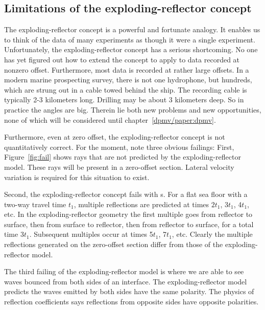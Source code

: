 \subsection{Limitations of the exploding-reflector concept}
\par
The exploding-reflector concept is a powerful and fortunate analogy.
It enables us to think of the data of many experiments
as though it were a single experiment.
Unfortunately,
the exploding-reflector concept has a serious shortcoming.
No one has yet figured out how to extend the concept
to apply to data recorded at nonzero offset.
Furthermore, most data is recorded at rather large offsets.
In a modern marine prospecting survey,
there is not one hydrophone,
but hundreds, which are strung out in a cable towed behind the ship.
The recording cable
is typically 2-3 kilometers long.
Drilling may be about 3 kilometers deep.
So in practice the angles are big.
Therein lie both new problems and new opportunities,
none of which will be considered until 
chapter~\ref{dpmv/paper:dpmv}.
\par
Furthermore, even at zero offset,
the exploding-reflector concept is not quantitatively correct.
For the moment, note three obvious failings:
First, Figure~\ref{fig:fail} shows rays that are not predicted
by the exploding-reflector model.
These rays will be present in a zero-offset section.
Lateral velocity variation is required for this
situation to exist.  
\par
Second, the exploding-reflector concept fails with s.
For a flat sea floor with a two-way travel time  $t_1$, multiple reflections
are predicted at times  $2t_1$,  3$t_1$,  4$t_1$, etc.
In the exploding-reflector geometry the first multiple
goes from reflector to surface,
then from surface to reflector,
then from reflector to surface, for a total time  3$t_1$.
Subsequent multiples occur at times  5$t_1$,  7$t_1$, etc.
Clearly the multiple reflections generated on the zero-offset section
differ from those of the exploding-reflector model.
\par
The third failing of the exploding-reflector model
is where we are able to see waves
bounced from both sides of an interface.
The exploding-reflector model predicts
the waves emitted by both sides have the same polarity.
The physics of reflection coefficients says
reflections from opposite sides have opposite polarities.


